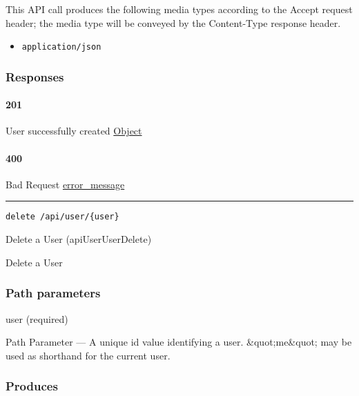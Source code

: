 This API call produces the following media types according to the
{Accept} request header; the media type will be conveyed by the
{Content-Type} response header.

\begin{itemize}
\tightlist
\item
  \texttt{application/json}
\end{itemize}

\hypertarget{responses-8}{%
\subsubsection{Responses}\label{responses-8}}

\hypertarget{section-26}{%
\paragraph{201}\label{section-26}}

User successfully created \protect\hyperlink{Object}{Object}

\hypertarget{section-27}{%
\paragraph{400}\label{section-27}}

Bad Request \protect\hyperlink{error_message}{error\_message}

\begin{center}\rule{0.5\linewidth}{\linethickness}\end{center}

\protect\hypertarget{apiUserUserDelete}{}{}

\begin{verbatim}
delete /api/user/{user}
\end{verbatim}

Delete a User ({apiUserUserDelete})

Delete a User

\hypertarget{path-parameters-4}{%
\subsubsection{Path parameters}\label{path-parameters-4}}

user (required)

{Path Parameter} --- A unique id value identifying a user.
\&quot;me\&quot; may be used as shorthand for the current user.

\hypertarget{produces-9}{%
\subsubsection{Produces}\label{produces-9}}

